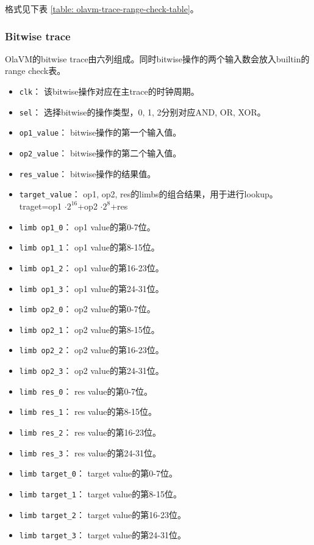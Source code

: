 格式见下表 \ref{table: olavm-trace-range-check-table}。

\begin{table}[!ht]
    \centering {}
    \caption{OlaVM的range check的trace表结构}
    \label{table: olavm-trace-range-check-table}
\end{table}

\subsubsection{Bitwise trace}\label{subsubsec: olavm-bitwise-trace}
OlaVM的bitwise trace由六列组成。同时bitwise操作的两个输入数会放入builtin的range check表。
\begin{itemize}
    \item \verb|clk|： 该bitwise操作对应在主trace的时钟周期。
    \item \verb|sel|： 选择bitwise的操作类型，0, 1, 2分别对应AND, OR, XOR。
    \item \verb|op1_value|： bitwise操作的第一个输入值。
    \item \verb|op2_value|： bitwise操作的第二个输入值。
    \item \verb|res_value|： bitwise操作的结果值。
    \item \verb|target_value|： op1, op2, res的limbs的组合结果，用于进行lookup。traget=op1 $\cdot 2^{16}$+op2 $\cdot 2^8$+res
    \item \verb|limb op1_0|： op1 value的第0-7位。
    \item \verb|limb op1_1|： op1 value的第8-15位。
    \item \verb|limb op1_2|： op1 value的第16-23位。
    \item \verb|limb op1_3|： op1 value的第24-31位。
    \item \verb|limb op2_0|： op2 value的第0-7位。
    \item \verb|limb op2_1|： op2 value的第8-15位。
    \item \verb|limb op2_2|： op2 value的第16-23位。
    \item \verb|limb op2_3|： op2 value的第24-31位。
    \item \verb|limb res_0|： res value的第0-7位。
    \item \verb|limb res_1|： res value的第8-15位。
    \item \verb|limb res_2|： res value的第16-23位。
    \item \verb|limb res_3|： res value的第24-31位。
    \item \verb|limb target_0|： target value的第0-7位。
    \item \verb|limb target_1|： target value的第8-15位。
    \item \verb|limb target_2|： target value的第16-23位。
    \item \verb|limb target_3|： target value的第24-31位。
\end{itemize}

